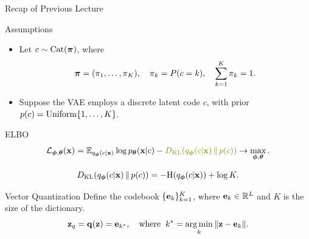 \documentclass{beamer}
\begin{document}
\begin{frame}{Recap of Previous Lecture}
	\begin{block}{Assumptions}
		\begin{itemize}
			\item Let $c \sim \operatorname{Cat}(\boldsymbol{\pi})$, where 
			\vspace{-0.6cm}
			\[
				\boldsymbol{\pi} = (\pi_1, \dots, \pi_K), \quad \pi_k = P(c = k), \quad \sum_{k=1}^K \pi_k = 1.
			\]
			\vspace{-0.7cm}
			\item Suppose the VAE employs a discrete latent code $c$, with prior $p(c) = \operatorname{Uniform}\{1, \dots, K\}$.
		\end{itemize}
	\end{block}
	\vspace{-0.3cm}
	\begin{block}{ELBO}
		\vspace{-0.7cm}
		\[
			\cL_{\bphi, \btheta}(\bx)  = \bbE_{q_{\bphi}(c| \bx)} \log \pt(\bx| c) - {\color{olive} \KL(q_{\bphi}(c| \bx) \,\|\, p(c))} \rightarrow \max_{\bphi, \btheta}.
		\]
	\end{block}
	\vspace{-1.0cm}
	\[
		D_\mathrm{KL}(q_{\boldsymbol{\phi}}(c| \mathbf{x}) \,\|\, p(c)) = - \mathrm{H}(q_{\boldsymbol{\phi}}(c| \mathbf{x})) + \log K. 
	\]		
	\vspace{-0.5cm}
	\begin{block}{Vector Quantization}
		Define the codebook $\{\mathbf{e}_k\}_{k=1}^K$, where $\mathbf{e}_k \in \mathbb{R}^L$ and $K$ is the size of the dictionary.
		\vspace{-0.3cm}
		\[
			\mathbf{z}_q = \mathbf{q} (\mathbf{z}) = \mathbf{e}_{k^*}, \quad \text{where}\;\; k^* = \operatorname*{arg\,min}_k \| \mathbf{z} - \mathbf{e}_k \|.
		\] 
		\vspace{-0.7cm}
	\end{block}
\end{frame}
\end{document}
